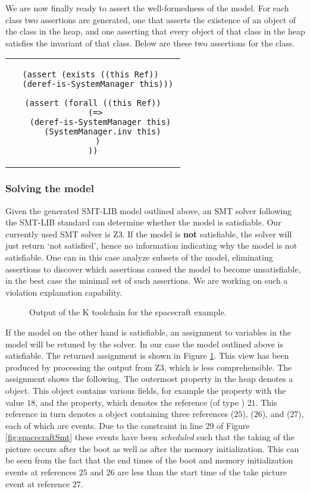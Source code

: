 We are now finally ready to assert the well-formedness of the
model. For each class two assertions are generated, one that asserts
the existence of an object of the class in the heap, and one asserting
that every object of that class in the heap satisfies the invariant of
that class. Below are these two assertions for the 
class.

\begin{center}
\begin{tabular}{c}
\begin{lstlisting}
(assert (exists ((this Ref)) 
  (deref-is-SystemManager this)))

(assert (forall ((this Ref))
  (=> 
    (deref-is-SystemManager this) 
    (SystemManager.inv this)
  )
))
\end{lstlisting}
\end{tabular}
\end{center}

\subsubsection{Solving the model}

Given the generated SMT-LIB model outlined above, an SMT solver
following the SMT-LIB standard can determine whether
the model is satisfiable. Our currently used SMT solver is Z3. If the
model is {\bf not} satisfiable, the solver will just return `not
satisfied', hence no information indicating why the model is not
satisfiable. One can in this case analyze subsets of the model,
eliminating assertions to discover which assertions caused the model
to become unsatisfiable, in the best case the minimal set of such
assertions. We are working on such a violation explanation capability.

\begin{figure}
\caption{Output of the K toolchain for the spacecraft example.}
\label{fig:shapes}
\end{figure}

If the model on the other hand is satisfiable, an assignment to
variables in the model will be retuned by the solver. In our case the
model outlined above is satisfiable. The returned assignment is shown
in Figure \ref{fig:shapes}. This view has been produced by processing
the output from Z3, which is less comprehensible.
%
The assignment shows the following. The outermost 
property in the heap denotes a  object.  This object
contains various fields, for example the  property with
the value $18$, and the  property, which denotes the
reference (of type ) $21$. This reference in turn denotes a
 object containing three references 
($25$),  ($26$), and  ($27$), each of
which are events. Due to the constraint in line 29 of Figure
\ref{fig:spacecraftSmt} these events have been {\em scheduled} such
that the taking of the picture occurs after the boot as well as after
the memory initialization.  This can be seen from the fact that the
end times of the boot and memory initialization events at references
$25$ and $26$ are less than the start time of the take picture event
at reference $27$.

\lstset{language=K}
